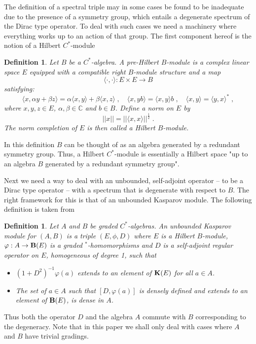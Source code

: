 \documentclass[12pt]{article}
\def\a{\alpha}
\def\b{\beta}
\newtheorem{definition}[thm]{Definition}
\begin{document}
The definition of a spectral triple may in some cases be found to be inadequate due to the presence of a symmetry group, which entails a degenerate spectrum of the Dirac type operator. To deal with such cases we need a machinery where everything works up to an action of that group. The first component hereof is the notion of a Hilbert $C^*$-module \cite{Blackadar}
\begin{definition}
Let $B$ be a $C^*$-algebra. A pre-Hilbert $B$-module is a complex linear space $E$ equipped with a compatible right $B$-module structure and a map 
$$
\langle \cdot,\cdot\rangle: E \times E \rightarrow B
$$
satisfying:
$$
\langle x, \a y + \b z \rangle = \a \langle x,y\rangle + \b \langle x,z\rangle  \;,
\quad 
\langle x,yb\rangle = \langle x,y\rangle b  \;,
\quad 
\langle x,y \rangle = \langle y,x \rangle^* \;,
$$
where $x,y,z\in E$, $\a,\b\in\mathbb{C}$ and $b\in B$.
Define a norm on $E$ by
$$
\vert\vert x \vert\vert = \vert\vert  \langle x,x\rangle  \vert\vert^{\frac{1}{2}} \;.
$$
The norm completion of $E$ is then called a Hilbert $B$-module.
\end{definition}
In this definition $B$ can be thought of as an algebra generated by a redundant symmetry group. Thus, a Hilbert $C^*$-module is essentially a Hilbert space "up to an algebra $B$ generated by a redundant symmetry group". 

Next we need a way to deal with an unbounded, self-adjoint operator -- to be a Dirac type operator -- with a spectrum that is degenerate with respect to $B$. The right framework for this is that of an unbounded Kasparov module. The following definition is taken from \cite{Blackadar}
\begin{definition}
Let $A$ and $B$ be graded $C^*$-algebras. An unbounded Kasparov module for $(A,B)$ is a triple $(E,\phi,D)$ where $E$ is a Hilbert $B$-module, $\varphi: A\rightarrow {\bf B}(E)$ is a graded $^*$-homomorphisms and $D$ is a self-adjoint regular operator on $E$, homogeneous of degree 1, such that
\begin{itemize}
\item[(i)]
$(1+D^2)^{-1} \varphi(a)$ extends to an element of ${\bf K}(E)$ for all $a\in A$.
\item[(ii)]
The set of $a\in A$ such that $[D,\varphi(a)]$ is densely defined and extends to an element of ${\bf B}(E)$, is dense in $A$.
\end{itemize}
\end{definition}
Thus both the operator $D$ and the algebra $A$ commute with $B$ corresponding to the degeneracy. Note that in this paper we shall only deal with cases where $A$ and $B$ have trivial gradings.
\end{document}
